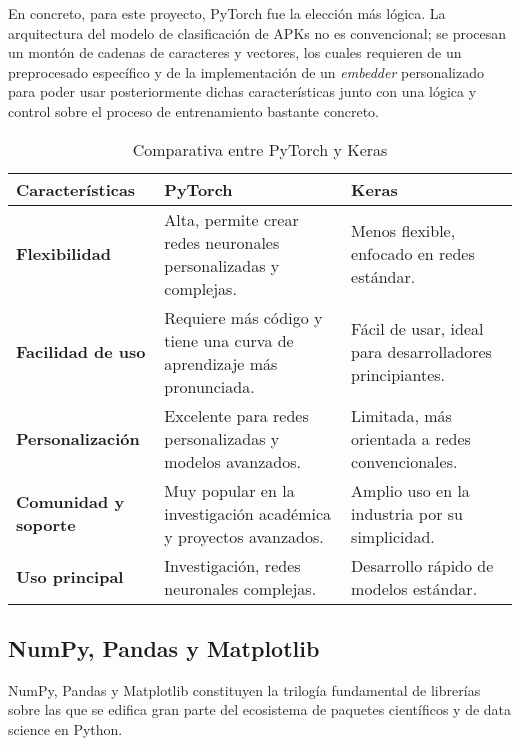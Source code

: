 En concreto, para este proyecto, PyTorch fue la elección más lógica. La arquitectura del modelo de clasificación de APKs no es convencional; se procesan un montón de cadenas de caracteres y vectores, los cuales requieren de un preprocesado específico y de la implementación de un \textit{embedder} personalizado para poder usar posteriormente dichas características junto con una lógica y control sobre el proceso de entrenamiento bastante concreto.


\begin{table}[!ht]
	\raggedleft
	\begin{tabular}{|l|l|l|}
		\hline
		\textbf{Características} & \textbf{PyTorch} & \textbf{Keras} \\ \hline
		\textbf{Flexibilidad} & Alta, permite crear redes neuronales personalizadas y complejas. & Menos flexible, enfocado en redes estándar. \\ \hline
		\textbf{Facilidad de uso} & Requiere más código y tiene una curva de aprendizaje más pronunciada. & Fácil de usar, ideal para desarrolladores principiantes. \\ \hline
		\textbf{Personalización} & Excelente para redes personalizadas y modelos avanzados. & Limitada, más orientada a redes convencionales. \\ \hline
		\textbf{Comunidad y soporte} & Muy popular en la investigación académica y proyectos avanzados. & Amplio uso en la industria por su simplicidad. \\ \hline
		\textbf{Uso principal} & Investigación, redes neuronales complejas. & Desarrollo rápido de modelos estándar. \\ \hline
	\end{tabular}
	\caption{Comparativa entre PyTorch y Keras}
\end{table}

\subsection{NumPy, Pandas y Matplotlib}

NumPy, Pandas y Matplotlib constituyen la trilogía fundamental de librerías sobre las que se edifica gran parte del ecosistema de paquetes científicos y de data science en Python.

